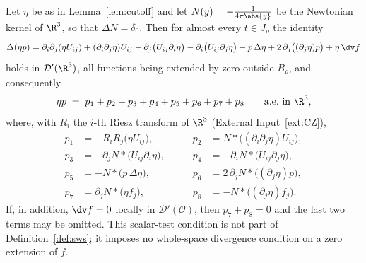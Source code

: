 \documentclass[11pt,reqno]{amsart}
\begin{document}
\begin{proposition}\label{prop:pressure-decomposition}
Let $\eta$ be as in Lemma~\ref{lem:cutoff} and let
$N(y)=-\tfrac1{4\pi\abs{y}}$ be the Newtonian kernel of $\R^{3}$, so that
$\Delta N=\delta_{0}$. Then for almost every $t\in J_{\rho}$ the identity
\begin{equation}\label{eq:laplace-etap}
  \Delta(\eta p)
  =\partial_{i}\partial_{j}(\eta U_{ij})
   +(\partial_{i}\partial_{j}\eta)U_{ij}
   -\partial_{j}\bigl(U_{ij}\partial_{i}\eta\bigr)
   -\partial_{i}\bigl(U_{ij}\partial_{j}\eta\bigr)
   -p\,\Delta\eta
   +2\,\partial_{j}\bigl((\partial_{j}\eta)p\bigr)
   +\eta\,\dv f
\end{equation}
holds in $\mathcal{D}'(\R^{3})$, all functions being extended by zero outside
$B_{\rho}$, and consequently
\begin{equation}\label{eq:pressure-decomposition}
  \eta p \;=\; p_{1}+p_{2}+p_{3}+p_{4}+p_{5}+p_{6}+p_{7}+p_{8}
  \qquad\text{a.e.\ in }\R^{3},
\end{equation}
where, with $R_{i}$ the $i$-th Riesz transform of $\R^{3}$
(External Input~\ref{ext:CZ}),
\begin{equation}\label{eq:pk}
\begin{aligned}
  p_{1}&=-R_{i}R_{j}\bigl(\eta U_{ij}\bigr), &\qquad
  p_{2}&=N*\bigl((\partial_{i}\partial_{j}\eta)U_{ij}\bigr),\\
  p_{3}&=-\partial_{j}N*\bigl(U_{ij}\partial_{i}\eta\bigr), &\qquad
  p_{4}&=-\partial_{i}N*\bigl(U_{ij}\partial_{j}\eta\bigr),\\
  p_{5}&=-N*\bigl(p\,\Delta\eta\bigr), &\qquad
  p_{6}&=2\,\partial_{j}N*\bigl((\partial_{j}\eta)p\bigr),\\
  p_{7}&=\partial_{j}N*\bigl(\eta f_{j}\bigr), &\qquad
  p_{8}&=-N*\bigl((\partial_{j}\eta)f_{j}\bigr).
\end{aligned}
\end{equation}
If, in addition, $\dv f=0$ locally in $\mathcal D'(\mathcal O)$, then
$p_{7}+p_{8}=0$ and the last two terms may be omitted. This scalar-test
condition is not part of Definition~\ref{def:sws}; it imposes no
whole-space divergence condition on a zero extension of $f$.
\end{proposition}
\end{document}
